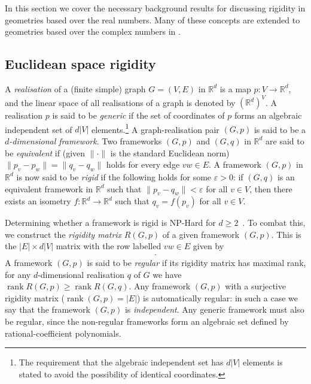 \documentclass[ALCO]{cedram}
\DeclareMathOperator{\rank}{rank}
\begin{document}
In this section we cover the necessary background results for discussing rigidity in geometries based over the real numbers.
Many of these concepts are extended to geometries based over the complex numbers in .

\subsection{Euclidean space rigidity}

A \emph{realisation} of a (finite simple) graph $G=(V,E)$ in $\mathbb{R}^d$ is a map $p:V \rightarrow \mathbb{R}^d$,
and the linear space of all realisations of a graph is denoted by $(\mathbb{R}^d)^V$.
A realisation $p$ is said to be \emph{generic} if the set of coordinates of $p$ forms an algebraic independent set of $d|V|$ elements.\footnote{The requirement that the algebraic independent set has $d|V|$ elements is stated to avoid the possibility of identical coordinates.}
A graph-realisation pair $(G,p)$ is said to be a \emph{$d$-dimensional framework}.
Two frameworks $(G,p)$ and $(G,q)$ in $\mathbb{R}^d$ are said to be \emph{equivalent} if (given $\|\cdot\|$ is the standard Euclidean norm) $\|p_v - p_w\| = \|q_v-q_w\|$ holds for every edge $vw \in E$.
A framework $(G,p)$ in $\mathbb{R}^d$ is now said to be \emph{rigid} if the following holds for some $\varepsilon >0$:
if $(G,q)$ is an equivalent framework in $\mathbb{R}^d$ such that $\|p_v-q_w\|<\varepsilon$ for all $v \in V$,
then there exists an isometry $f: \mathbb{R}^d \rightarrow \mathbb{R}^d$ such that $q_v = f(p_v)$ for all $v \in V$.

Determining whether a framework is rigid is NP-Hard for $d \geq 2$~\cite{Abbot}.
To combat this, we construct the \emph{rigidity matrix} $R(G,p)$ of a given framework $(G,p)$.
This is the $|E| \times d|V|$ matrix with the row labelled $vw \in E$ given by
\begin{align*}
	[ 0 \quad \cdots  \quad 0  \quad \overbrace{p_v-p_w}^{v} \quad 0  \quad \cdots  \quad 0  \quad \overbrace{p_w-p_v}^{w} \quad 0  \quad \cdots  \quad 0].
\end{align*}
A framework $(G,p)$ is said to be \emph{regular} if its rigidity matrix has maximal rank,
\ie for any $d$-dimensional realisation $q$ of $G$ we have $\rank R(G,p) \geq \rank R(G,q)$.
Any framework $(G,p)$ with a surjective rigidity matrix (\ie $\rank (G,p)=|E|$) is automatically regular:
in such a case we say that the framework $(G,p)$ is \emph{independent}.
Any generic framework must also be regular, since the non-regular frameworks form an algebraic set defined by rational-coefficient polynomials.
\end{document}
